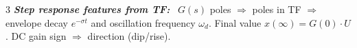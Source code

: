 \documentclass[9pt]{extarticle}
\newcommand{\sub}[1]{\textit{\textbf{#1:}}\ }
\begin{document}
\begin{multicols}{3}
\sub{Step response features from TF} $G(s)$ poles $\Rightarrow$ poles in TF $\Rightarrow$ envelope decay $e^{-\sigma t}$ and oscillation frequency $\omega_d$. Final value $x(\infty)=G(0)\cdot U$. DC gain sign $\Rightarrow$ direction (dip/rise).\\


\end{multicols}
\end{document}
